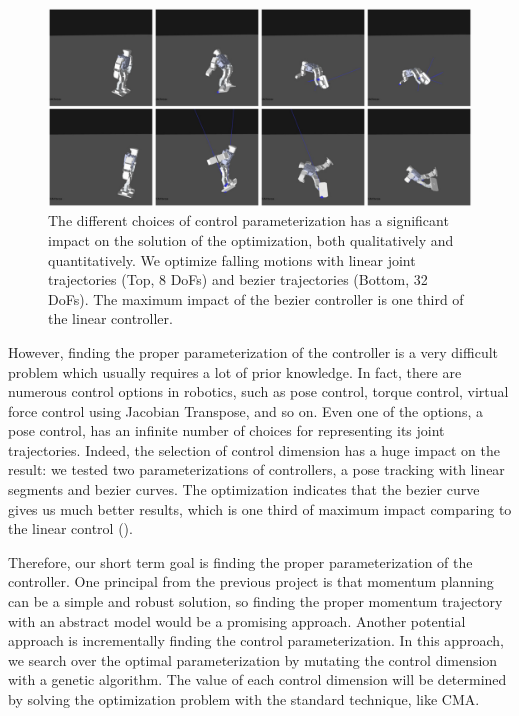 \begin{figure}[htbp]
\center
  \includegraphics[width=\linewidth]{images/falling2_result}
  \caption{
    The different choices of control parameterization has a significant
    impact on the solution of the optimization, both qualitatively
    and quantitatively.
    We optimize falling motions with linear joint trajectories (Top, 8 DoFs)
    and bezier trajectories (Bottom, 32 DoFs). The maximum impact of the
    bezier controller is one third of the linear controller.}
 \label{fig:robotFalling}
\end{figure}

However, finding the proper parameterization of the controller
is a very difficult problem which usually requires a lot of prior knowledge.
In fact, there are numerous control options in robotics, such as
pose control, torque control, virtual force control using Jacobian
Transpose, and so on.
Even one of the options, a pose control, has an infinite number of choices for
representing its joint trajectories.
Indeed, the selection of control dimension has a huge impact on the
result: we tested two parameterizations of controllers, a pose tracking 
with linear segments and bezier curves. 
The optimization indicates that the bezier curve gives us 
much better results, which is one third of maximum impact
comparing to the linear control ().

Therefore, our short term goal is finding the proper parameterization
of the controller.
One principal from the previous project is that
momentum planning can be a simple and robust solution, so finding the 
proper momentum trajectory with an abstract model would be 
a promising approach.
Another potential approach is incrementally finding the control 
parameterization. 
In this approach, we search over the optimal parameterization by 
mutating the control dimension with a genetic algorithm.
The value of each control dimension will be determined by solving
the optimization problem with the standard technique, like CMA.


